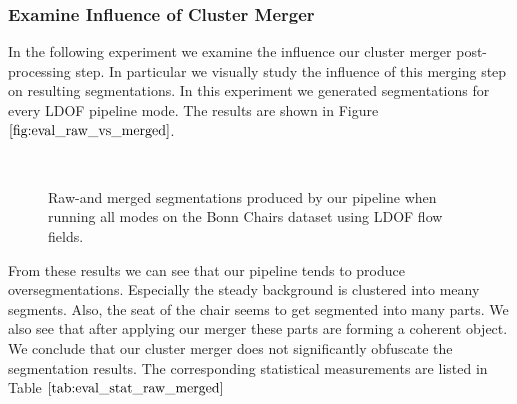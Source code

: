 \subsubsection{Examine Influence of Cluster Merger}
In the following experiment we examine the influence our cluster merger post-processing step. In particular we visually study the influence of this merging step on resulting segmentations. In this experiment we generated segmentations for every LDOF pipeline mode. The results are shown in Figure $\ref{fig:eval_raw_vs_merged}$.
\begin{figure}[H]
\begin{center}
~
~
\end{center}
\caption[Bonn Chairs Segmentations Frame 30]{Raw-and merged segmentations produced by our pipeline when running all modes on the Bonn Chairs dataset using LDOF flow fields.}
\label{fig:eval_raw_vs_merged}
\end{figure}
From these results we can see that our pipeline tends to produce oversegmentations. Especially the steady background is clustered into meany segments. Also, the seat of the chair seems to get segmented into many parts. We also see that after applying our merger these parts are forming a coherent object. We conclude that our cluster merger does not significantly obfuscate the segmentation results. The corresponding statistical measurements are listed in Table $\ref{tab:eval_stat_raw_merged}$

